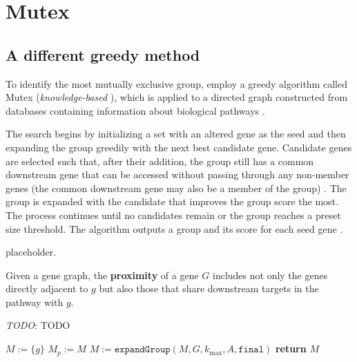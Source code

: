 \section{Mutex}

\subsection{A different greedy method}

To identify the most mutually exclusive group, \textcite{mutex} employ a greedy algorithm called Mutex (\textit{knowledge-based} \cite{survey}), which is applied to a directed graph constructed from databases containing information about biological pathways .

The search begins by initializing a set with an altered gene as the seed and then expanding the group greedily with the next best candidate gene. Candidate genes are selected such that, after their addition, the group still has a common downstream gene that can be accessed without passing through any non-member genes (the common downstream gene may also be a member of the group) . The group is expanded with the candidate that improves the group score the most. The process continues until no candidates remain or the group reaches a preset size threshold. The algorithm outputs a group and its score for each seed gene .

placeholder. 

\begin{definition}[Proximity]
    Given a gene graph, the \textbf{proximity} of a gene $G$ includes not only the genes directly adjacent to $g$ but also those that share downstream targets in the pathway with $g$. 
\end{definition}

\begin{algorithm}[H]
    \caption{
        \textit{TODO}: TODO
    }

        \label{greedy_mutex}
    \begin{algorithmic}[1]
            \State $M := \{g\}$
            \Do
                \State $M_p := M$
                \State $M := \texttt{expandGroup}(M, G, k_\mathrm{max}, A, \texttt{final})$
             
            \State \textbf{return} $M$
        \EndFunction
    \end{algorithmic}
\end{algorithm}

